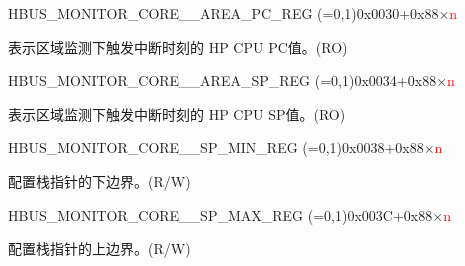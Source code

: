 \begin{register}{H}{BUS\_MONITOR\_CORE\_\_AREA\_PC\_REG (=0,1)}{0x0030+0x88×\textcolor{red}{n}}\label{regdesc:BUSMONITORCORE0AREAPCREG}
%
\regnewline%
\begin{regdesc}\begin{reglist}
\label{fielddesc:BUSMONITORCORE0AREAPC}\item [BUS\_MONITOR\_CORE\_\regindex{n}\_AREA\_PC] 表示区域监测下触发中断时刻的 HP CPU PC值。(RO)
\end{reglist}\end{regdesc}
\end{register}


\begin{register}{H}{BUS\_MONITOR\_CORE\_\_AREA\_SP\_REG (=0,1)}{0x0034+0x88×\textcolor{red}{n}}\label{regdesc:BUSMONITORCORE0AREASPREG}
%
\regnewline%
\begin{regdesc}\begin{reglist}
\label{fielddesc:BUSMONITORCORE0AREASP}\item [BUS\_MONITOR\_CORE\_\regindex{n}\_AREA\_SP] 表示区域监测下触发中断时刻的 HP CPU SP值。(RO)
\end{reglist}\end{regdesc}
\end{register}


\begin{register}{H}{BUS\_MONITOR\_CORE\_\_SP\_MIN\_REG (=0,1)}{0x0038+0x88×\textcolor{red}{n}}\label{regdesc:BUSMONITORCORE0SPMINREG}
%
\regnewline%
\begin{regdesc}\begin{reglist}
\label{fielddesc:BUSMONITORCORE0SPMIN}\item [BUS\_MONITOR\_CORE\_\regindex{n}\_SP\_MIN] 配置栈指针的下边界。(R/W)
\end{reglist}\end{regdesc}
\end{register}


\begin{register}{H}{BUS\_MONITOR\_CORE\_\_SP\_MAX\_REG (=0,1)}{0x003C+0x88×\textcolor{red}{n}}\label{regdesc:BUSMONITORCORE0SPMAXREG}
%
\regnewline%
\begin{regdesc}\begin{reglist}
\label{fielddesc:BUSMONITORCORE0SPMAX}\item [BUS\_MONITOR\_CORE\_\regindex{n}\_SP\_MAX] 配置栈指针的上边界。(R/W)
\end{reglist}\end{regdesc}
\end{register}


